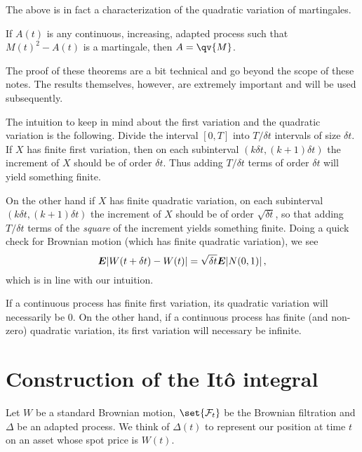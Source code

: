 The above is in fact a characterization of the quadratic variation of martingales.

\begin{theorem}\label{t:3qv2}
  If $A(t)$ is any continuous, increasing, adapted process such that $M(t)^2 - A(t)$ is a martingale, then $A = \qv{M}$.
\end{theorem}

The proof of these theorems are a bit technical and go beyond the scope of these notes.
The results themselves, however, are extremely important and will be used subsequently.

\begin{remark}
  The intuition to keep in mind about the first variation and the quadratic variation is the following.
  Divide the interval $[0, T]$ into $T/\delta t$ intervals of size $\delta t$.
  If $X$ has finite first variation, then on each subinterval $(k \delta t, (k+1) \delta t)$ the increment of $X$ should be of order $\delta t$.
  Thus adding $T / \delta t$ terms of order $\delta t$ will yield something finite.

  On the other hand if $X$ has finite quadratic variation, on each subinterval $(k \delta t, (k+1) \delta t)$ the increment of $X$ should be of order $\sqrt{\delta t}$, so that adding $T / \delta t$ terms of the \emph{square} of the increment yields something finite.
  Doing a quick check for Brownian motion (which has finite quadratic variation), we see
  \begin{equation*}
    \bm{E} \lvert W(t + \delta t) - W(t)\rvert = \sqrt{\delta t} \bm{E} \lvert N(0, 1)\rvert\,,
  \end{equation*}
  which is in line with our intuition.
\end{remark}

\begin{remark}
  If a continuous process has finite first variation, its quadratic variation will necessarily be $0$.
  On the other hand, if a continuous process has finite (and non-zero) quadratic variation, its first variation will necessary be infinite.
\end{remark}


\section{Construction of the It\^o integral}

Let $W$ be a standard Brownian motion, $\set{\mathcal F_t}$ be the Brownian filtration and $\Delta$ be an adapted process.
We think of $\Delta(t)$ to represent our position at time $t$ on an asset whose spot price is $W(t)$.

